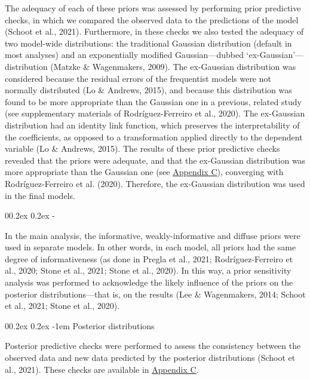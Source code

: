 \documentclass[
  12pt,
  man,floatsintext]{apa7}
\makeatletter
\let\oldparagraph\paragraph
\renewcommand{\paragraph}[1]{\oldparagraph{#1}\mbox{}}
\let\oldsubparagraph\subparagraph
\renewcommand{\subparagraph}[1]{\oldsubparagraph{#1}\mbox{}}
\renewcommand{\paragraph}{\@startsection{paragraph}{4}{\parindent}%
  {0\baselineskip \@plus 0.2ex \@minus 0.2ex}%
  {-1em}%
  {\normalfont\normalsize\bfseries\itshape\typesectitle}}
\renewcommand{\subparagraph}[1]{\@startsection{subparagraph}{5}{1em}%
  {0\baselineskip \@plus 0.2ex \@minus 0.2ex}%
  {-\z@\relax}%
  {\normalfont\normalsize\itshape\hspace{\parindent}{#1}\textit{\addperi}}{\relax}}
\makeatother
\begin{document}
The adequacy of each of these priors was assessed by performing prior predictive checks, in which we compared the observed data to the predictions of the model (Schoot et al., 2021). Furthermore, in these checks we also tested the adequacy of two model-wide distributions: the traditional Gaussian distribution (default in most analyses) and an exponentially modified Gaussian---dubbed `ex-Gaussian'---distribution (Matzke \& Wagenmakers, 2009). The ex-Gaussian distribution was considered because the residual errors of the frequentist models were not normally distributed (Lo \& Andrews, 2015), and because this distribution was found to be more appropriate than the Gaussian one in a previous, related study (see supplementary materials of Rodríguez-Ferreiro et al., 2020). The ex-Gaussian distribution had an identity link function, which preserves the interpretability of the coefficients, as opposed to a transformation applied directly to the dependent variable (Lo \& Andrews, 2015). The results of these prior predictive checks revealed that the priors were adequate, and that the ex-Gaussian distribution was more appropriate than the Gaussian one (see \protect\hyperlink{appendix-C-Bayesian-analysis-diagnostics}{\underline{Appendix C}}), converging with Rodríguez-Ferreiro et al. (2020). Therefore, the ex-Gaussian distribution was used in the final models.

\hypertarget{prior-sensitivity-analysis}{%
\subparagraph{Prior sensitivity analysis}\label{prior-sensitivity-analysis}}

In the main analysis, the informative, weakly-informative and diffuse priors were used in separate models. In other words, in each model, all priors had the same degree of informativeness (as done in Pregla et al., 2021; Rodríguez-Ferreiro et al., 2020; Stone et al., 2021; Stone et al., 2020). In this way, a prior sensitivity analysis was performed to acknowledge the likely influence of the priors on the posterior distributions---that is, on the results (Lee \& Wagenmakers, 2014; Schoot et al., 2021; Stone et al., 2020).

\hypertarget{posterior-distributions}{%
\paragraph{Posterior distributions}\label{posterior-distributions}}

Posterior predictive checks were performed to assess the consistency between the observed data and new data predicted by the posterior distributions (Schoot et al., 2021). These checks are available in \protect\hyperlink{appendix-C-Bayesian-analysis-diagnostics}{\underline{Appendix C}}.
\end{document}
